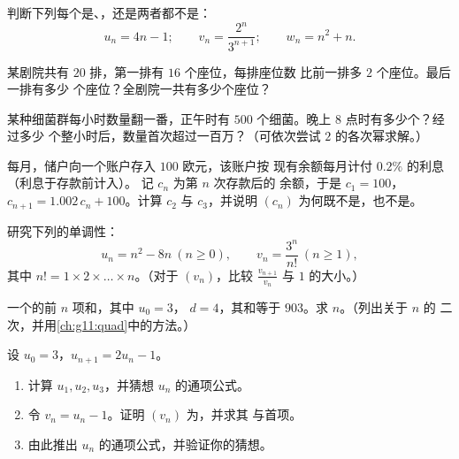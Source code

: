 \begin{exercise}[$\star$]\label{exo:g11:seq:5}
判断下列每个是、，还是两者都不是：
\[
u_n = 4n - 1; \qquad
v_n = \frac{2^n}{3^{n+1}}; \qquad
w_n = n^2 + n .
\]
\end{exercise}

\begin{exercise}[$\star\star$]\label{exo:g11:seq:6}
某剧院共有 $20$ 排，第一排有 $16$ 个座位，每排座位数
比前一排多 $2$ 个座位。最后一排有多少
个座位？全剧院一共有多少个座位？
\end{exercise}

\begin{exercise}[$\star\star$]\label{exo:g11:seq:7}
某种细菌群每小时数量翻一番，正午时有 $500$
个细菌。晚上 8 点时有多少个？经过多少
个整小时后，数量首次超过一百万？（可依次尝试
$2$ 的各次幂求解。）
\end{exercise}

\begin{exercise}[$\star\star$]\label{exo:g11:seq:8}
每月，储户向一个账户存入 $100$ 欧元，该账户按
现有余额每月计付 $0.2\%$ 的利息（利息于存款前计入）。
记 $c_n$ 为第 $n$ 次存款后的
余额，于是 $c_1 = 100$，$c_{n+1} = 1.002\,c_n + 100$。计算 $c_2$
与 $c_3$，并说明 $(c_n)$ 为何既不是，也不是。
\end{exercise}

\begin{exercise}[$\star\star$]\label{exo:g11:seq:9}
研究下列的单调性：
\[
u_n = n^2 - 8n \ (n \geq 0), \qquad
v_n = \frac{3^n}{n!}\ (n \geq 1),
\]
其中 $n! = 1 \times 2 \times \dots \times n$。（对于 $(v_n)$，比较
$\frac{v_{n+1}}{v_n}$ 与 $1$ 的大小。）
\end{exercise}

\begin{exercise}[$\star\star$]\label{exo:g11:seq:10}
一个的前 $n$ 项和，其中 $u_0 = 3$，
$d = 4$，其和等于 $903$。求 $n$。（列出关于 $n$ 的
二次，并用\cref{ch:g11:quad}中的方法。）
\end{exercise}

\begin{exercise}[$\star\star\star$]\label{exo:g11:seq:11}
设 $u_0 = 3$，$u_{n+1} = 2u_n - 1$。
\begin{enumerate}
  \item 计算 $u_1, u_2, u_3$，并猜想 $u_n$ 的通项公式。
  \item 令 $v_n = u_n - 1$。证明 $(v_n)$ 为，并求其
        与首项。
  \item 由此推出 $u_n$ 的通项公式，并验证你的猜想。
\end{enumerate}
\end{exercise}

